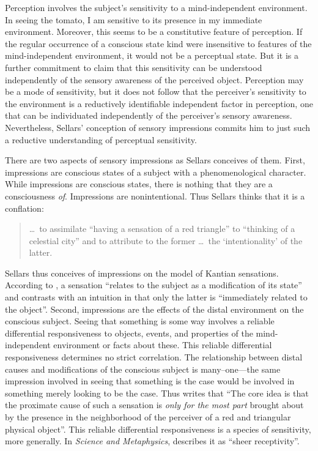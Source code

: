 \documentclass[12pt]{article}
\begin{document}
Perception involves the subject's sensitivity to a mind-independent environment. In seeing the tomato, I am sensitive to its presence in my immediate environment. Moreover, this seems to be a constitutive feature of perception. If the regular occurrence of a conscious state kind were insensitive to features of the mind-independent environment, it would not be a perceptual state. But it is a further commitment to claim that this sensitivity can be understood independently of the sensory awareness of the perceived object. Perception may be a mode of sensitivity, but it does not follow that the perceiver's sensitivity to the environment is a reductively identifiable independent factor in perception, one that can be individuated independently of the perceiver's sensory awareness. Nevertheless, Sellars' conception of sensory impressions commits him to just such a reductive understanding of perceptual sensitivity.

There are two aspects of sensory impressions as Sellars conceives of them. First, impressions are conscious states of a subject with a phenomenological character. While impressions are conscious states, there is nothing that they are a consciousness \emph{of}. Impressions are nonintentional. Thus Sellars thinks that it is a conflation:
\begin{quote}
    \ldots\ to assimilate ``having a sensation of a red triangle'' to ``thinking of a celestial city'' and to attribute to the former \ldots\ the `intentionality' of the latter. \citep[§7]{Sellars:1956xp}
\end{quote}
Sellars thus conceives of impressions on the model of Kantian sensations. According to \citet[B376--7]{Kant:1781fk}, a sensation ``relates to the subject as a modification of its state'' and contrasts with  an intuition in that only the latter is ``immediately related to the object''. Second, impressions are the effects of the distal environment on the conscious subject. Seeing that something is some way involves a reliable differential responsiveness to objects, events, and properties of the mind-independent environment or facts about these. This reliable differential responsiveness determines no strict correlation. The relationship between distal causes and modifications of the conscious subject is many--one---the same impression involved in seeing that something is the case would be involved in something merely looking to be the case. Thus \citet[§7]{Sellars:1956xp} writes that ``The core idea is that the proximate cause of such a sensation is \emph{only for the most part} brought about by the presence in the neighborhood of the perceiver of a red and triangular physical object''. This reliable differential responsiveness is a species of sensitivity, more generally. In \emph{Science and Metaphysics}, \citet[4]{Sellars:1967uq} describes it as ``sheer receptivity''.
\end{document}
